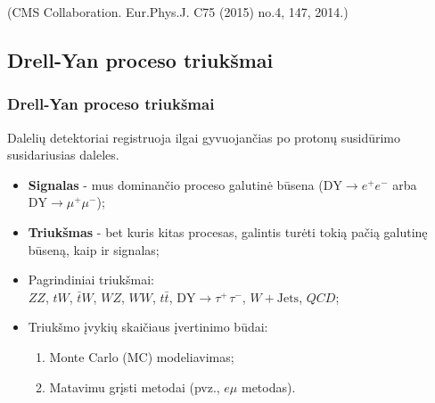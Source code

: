 \documentclass[xcolor=dvipsnames]{beamer}
\newcommand{\WJets}{\mathit{W}+\mathrm{Jets}}
\newcommand{\emu}{\mathit{e}\mu}
\begin{document}
\begin{frame}
\begin{minipage}{0.54\textwidth}
\begin{figure}[H]
		\end{figure}
		\vspace{-0.4cm}
		\tiny\centering(CMS Collaboration. Eur.Phys.J. C75 (2015) no.4, 147, 2014.)
	\end{minipage}
\end{frame}


\begin{frame}
	\section{Drell-Yan proceso triukšmai}
	\frametitle{Drell-Yan proceso triukšmai}
	Dalelių detektoriai registruoja ilgai gyvuojančias po protonų susidūrimo susidariusias daleles.

	\medskip

	\begin{itemize}
		\item \textbf{Signalas} - mus dominančio proceso galutinė būsena ($\mathrm{DY}\!\rightarrow\!\mathit{e^{+}\! e^{-}}$ arba
		$\mathrm{DY}\!\rightarrow\!\mathit{\mu^{+}\! \mu^{-}}$);
		\item \textbf{Triukšmas} - bet kuris kitas procesas, galintis turėti tokią pačią galutinę būseną, kaip ir signalas;
		\medskip
		\item Pagrindiniai triukšmai:\\
		$\mathit{ZZ}$, $\mathit{tW}$, $\bar{\mathit{t}}\mathit{W}$, $\mathit{WZ}$, $\mathit{WW}$, $\mathit{t}\bar{\mathit{t}}$,
		$\mathrm{DY}\!\rightarrow\!\mathit{\tau^{+\,}\!\tau^{-}}$, $\WJets$, $\mathit{QCD}$;
		\medskip
		\item Triukšmo įvykių skaičiaus įvertinimo būdai:
		\begin{enumerate}
			\item Monte Carlo (MC) modeliavimas;
			\item Matavimu grįsti metodai (pvz., $\emu$ metodas).
		\end{enumerate}
	\end{itemize}
\end{frame}
\end{document}
